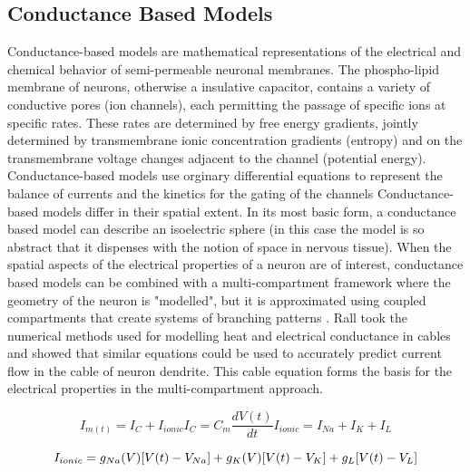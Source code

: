 \subsection{Conductance Based Models}
Conductance-based models are mathematical representations of the electrical and chemical behavior of semi-permeable neuronal membranes.
The phospho-lipid membrane of neurons, otherwise a insulative capacitor, contains a variety of conductive pores (ion channels), each permitting the passage of specific ions at specific rates.
These rates are determined by free energy gradients, jointly determined by transmembrane ionic concentration gradients (entropy) and on the transmembrane voltage changes adjacent to the channel (potential energy).
Conductance-based models use orginary differential equations to represent the balance of currents and the kinetics for the gating of the channels
Conductance-based models differ in their spatial extent. In its most basic form, a conductance based model can describe an isoelectric sphere (in this case the model is so abstract that it dispenses with the notion of space in nervous tissue).
When the spatial aspects of the electrical properties of a neuron are of interest, conductance based models can be combined with a multi-compartment framework where the geometry of the neuron is "modelled", but it is approximated using coupled compartments that create systems of branching patterns \citep{rall1962electrophysiology}.
Rall took the numerical methods used for modelling heat and electrical conductance in cables and showed that similar equations could be used to accurately predict current flow in the cable of neuron dendrite. This cable equation forms the basis for the electrical properties in the multi-compartment approach.
\\
\begin{center}
\begin{equation}
I_{m(t)}=I_{C}+I_{ionic} 
I_{C}=C_{m}\frac{dV(t)}{dt} 
I_{ionic}=I_{Na}+I_{K}+I_{L}
\end{equation}
\end{center}
\begin{equation}
I_{ionic}=\\
g_{Na}(V)[V(t)-V_{Na}]+\\
g_{K}(V)[V(t)-V_{K}]+\\g_{L}[V(t)-V_{L}] 
\end{equation}
